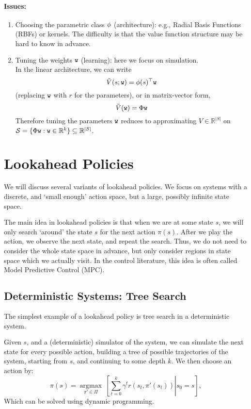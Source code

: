 \begin{enumerate}
\paragraph{Issues:}
\begin{enumerate}
\item Choosing the parametric class $\phi$ (architecture): e.g., Radial Basis Functions (RBFs) or kernels. The difficulty is that the value function structure may be hard to know in advance.
\item Tuning the weights $\texttt{w}$ (learning): here we focus on simulation.\\
In the linear architecture, we can write
$$\tilde{V}(s;\texttt{w})=\phi(s)^\top \texttt{w}$$
(replacing $\texttt{w}$ with $r$ for the parameters), or in matrix-vector form,
$$\tilde{ {V}}( {\texttt{w}}) =  { {\Phi}} { \texttt{w}}$$
Therefore tuning the parameters $ {\texttt{w}}$ reduces to approximating $ {V} \in \mathbb{R}^{|S|}$ on $\mathcal{S}=\{  { {\Phi}} {\texttt{w}}:  {\texttt{w}} \in \mathbb{R}^k\} \subseteq  \mathbb{R}^{|S|} $.

\end{enumerate}

\end{enumerate}

\section{Lookahead Policies}

We will discuss several variants of lookahead policies. We focus on systems with a discrete, and `small enough' action space, but a large, possibly infinite state space.

The main idea in lookahead policies is that when we are at some state $s$, we will only search `around' the state $s$ for the next action $\pi(s)$. After we play the action, we observe the next state, and repeat the search.
Thus, we do not need to consider the whole state space in advance, but only consider regions in state space which we actually visit.
In the control literature, this idea is often called Model Predictive Control (MPC).

\subsection{Deterministic Systems: Tree Search}
The simplest example of a lookahead policy is tree search in a deterministic system.

Given $s$, and a (deterministic) simulator of the system, we can simulate the next state for every possible action, building a tree of possible trajectories of the system, starting from $s$, and continuing to some depth $k$. 
We then choose an action by:
$$\pi(s) = \underset{\pi' \in \Pi}{\operatorname{argmax}}\  \left[\left.\sum_{t=0}^{k} \gamma^t r(s_{t},{\pi'}(s_{t})) \right| s_0 = s\right],$$
Which can be solved using dynamic programming.

